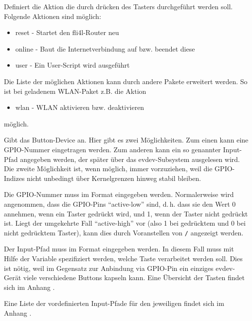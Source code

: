 \begin{description}
  Definiert die Aktion die durch drücken des Tasters durchgeführt werden soll.
  Folgende Aktionen sind möglich:
  \begin{itemize}
    \item reset - Startet den fli4l-Router neu
    \item online - Baut die Internetverbindung auf bzw. beendet diese
    \item user - Ein User-Script wird ausgeführt
  \end{itemize}
  
  Die Liste der möglichen Aktionen kann durch andere Pakete erweitert werden.
  So ist bei geladenem WLAN-Paket z.B. die Aktion 
  \begin{itemize}
    \item wlan - WLAN aktivieren bzw. deaktivieren
  \end{itemize}
  möglich.
  
  Gibt das Button-Device an. Hier gibt es zwei Möglichkeiten. Zum einen kann
  eine GPIO-Nummer eingetragen werden. Zum anderen kann ein so genannter
  Input-Pfad angegeben werden, der später über das evdev-Subsystem ausgelesen
  wird. Die zweite Möglichkeit ist, wenn möglich, immer vorzuziehen, weil die
  GPIO-Indizes nicht unbedingt über Kernelgrenzen hinweg stabil bleiben.

  Die GPIO-Nummer muss im Format  eingegeben werden. Normalerweise
  wird angenommen, dass die GPIO-Pins ``active-low'' sind, d.\,h. dass sie den
  Wert 0 annehmen, wenn ein Taster gedrückt wird, und 1, wenn der Taster nicht
  gedrückt ist. Liegt der umgekehrte Fall ``active-high'' vor (also 1 bei
  gedrücktem und 0 bei nicht gedrücktem Taster), kann dies durch Voranstellen
  von \texttt{/} angezeigt werden.

  Der Input-Pfad muss im Format  eingegeben werden. In diesem
  Fall muss mit Hilfe der Variable 
  spezifiziert werden, welche Taste verarbeitet werden soll. Dies ist nötig,
  weil im Gegensatz zur Anbindung via GPIO-Pin ein einziges evdev-Gerät viele
  verschiedene Buttons kapseln kann. Eine Übersicht der Tasten findet sich im
  Anhang .

  Eine Liste der vordefinierten Input-Pfade für den jeweiligen 
  findet sich im Anhang .


\end{description}
